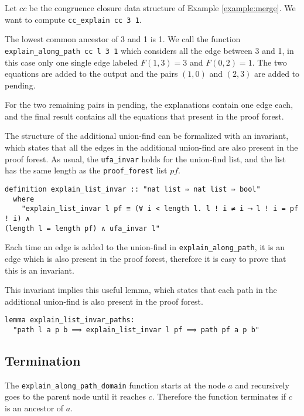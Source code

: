 \begin{exmp}
Let $cc$ be the congruence closure data structure of Example \ref{example:merge}. We want to compute \lstinline|cc_explain cc 3 1|.

The lowest common ancestor of 3 and 1 is 1. We call the function \lstinline{explain_along_path cc l 3 1} which considers all the edge between 3 and 1, in this case only one single edge labeled $F (1,3) = 3$ and $F(0,2) = 1$. The two equations are added to the output and the pairs $(1,0)$ and $(2,3)$ are added to pending.

For the two remaining pairs in pending, the explanations contain one edge each, and the final result contains all the equations that present in the proof forest.
\end{exmp}


The structure of the additional union-find can be formalized with an invariant, which states that all the edges in the additional union-find are also present in the proof forest. As usual, the \lstinline{ufa_invar} holds for the union-find list, and the list has the same length as the \lstinline{proof_forest} list $pf$.

\begin{lstlisting}
definition explain_list_invar :: "nat list ⇒ nat list ⇒ bool"
  where
    "explain_list_invar l pf ≡ (∀ i < length l. l ! i ≠ i ⟶ l ! i = pf ! i) ∧
(length l = length pf) ∧ ufa_invar l"
\end{lstlisting}

Each time an edge is added to the union-find in \lstinline{explain_along_path}, it is an edge which is also present in the proof forest, therefore it is easy to prove that this is an invariant.

This invariant implies this useful lemma, which states that each path in the additional union-find is also present in the proof forest.

\begin{lstlisting}
lemma explain_list_invar_paths:
  "path l a p b ⟹ explain_list_invar l pf ⟹ path pf a p b"
\end{lstlisting}

\subsection{Termination}

The \lstinline{explain_along_path_domain} function starts at the node $a$ and recursively goes to the parent node until it reaches $c$. Therefore the function terminates if $c$ is an ancestor of $a$.

